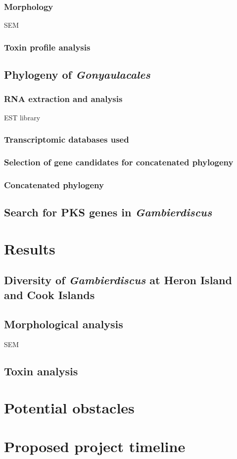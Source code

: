\documentclass[12pt]{article}
\begin{document}
\subsubsection{Morphology}
SEM

\subsubsection{Toxin profile analysis}

\subsection{Phylogeny of \emph{Gonyaulacales}}

\subsubsection{RNA extraction and analysis}
EST library

\subsubsection{Transcriptomic databases used}

\subsubsection{Selection of gene candidates for concatenated phylogeny}

\subsubsection{Concatenated phylogeny}

\subsection{Search for PKS genes in \emph{Gambierdiscus}}

\section{Results}

\subsection{Diversity of \emph{Gambierdiscus} at Heron Island and Cook Islands}

\subsection{Morphological analysis}
SEM

\subsection{Toxin analysis}

\section{Potential obstacles}

\section{Proposed project timeline}

\newpage


\end{document}
